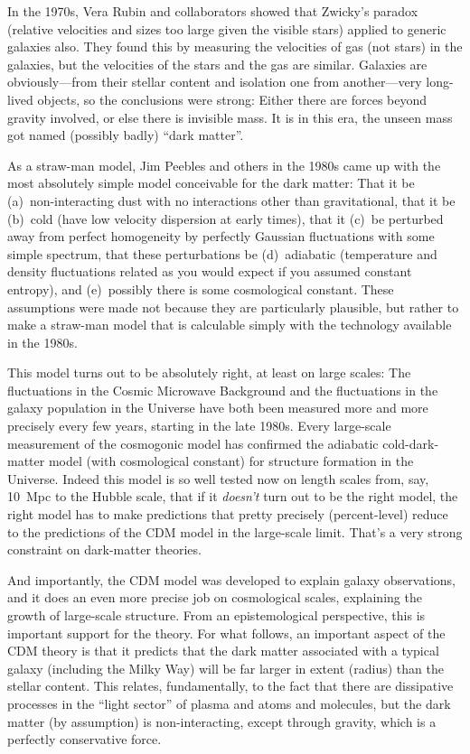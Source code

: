\documentclass[12pt]{article}
\begin{document}
In the 1970s, Vera Rubin and collaborators showed that Zwicky's
paradox (relative velocities and sizes too large given the visible
stars) applied to generic galaxies also.  They found this by measuring
the velocities of gas (not stars) in the galaxies, but the velocities
of the stars and the gas are similar.  Galaxies are obviously---from
their stellar content and isolation one from another---very long-lived
objects, so the conclusions were strong: Either there are forces
beyond gravity involved, or else there is invisible mass.  It is in
this era, the unseen mass got named (possibly badly) ``dark matter''.

As a straw-man model, Jim Peebles and others in the 1980s came up with
the most absolutely simple model conceivable for the dark matter: That
it be (a)~non-interacting dust with no interactions other than
gravitational, that it be (b)~cold (have low velocity dispersion at
early times), that it (c)~be perturbed away from perfect homogeneity
by perfectly Gaussian fluctuations with some simple spectrum, that
these perturbations be (d)~adiabatic (temperature and density
fluctuations related as you would expect if you assumed constant
entropy), and (e)~possibly there is some cosmological constant.  These
assumptions were made not because they are particularly plausible, but
rather to make a straw-man model that is calculable simply with the
technology available in the 1980s.

This model turns out to be absolutely right, at least on large scales:
The fluctuations in the Cosmic Microwave Background and the
fluctuations in the galaxy population in the Universe have both been
measured more and more precisely every few years, starting in the late
1980s.  Every large-scale measurement of the cosmogonic model has
confirmed the adiabatic cold-dark-matter model (with cosmological
constant) for structure formation in the Universe.  Indeed this model
is so well tested now on length scales from, say, 10~Mpc to the Hubble
scale, that if it \emph{doesn't} turn out to be the right model, the
right model has to make predictions that pretty precisely
(percent-level) reduce to the predictions of the CDM model in the
large-scale limit.  That's a very strong constraint on dark-matter
theories.

And importantly, the CDM model was developed to explain galaxy
observations, and it does an even more precise job on cosmological
scales, explaining the growth of large-scale structure.  From an
epistemological perspective, this is important support for the theory.
For what follows, an important aspect of the CDM theory is that it
predicts that the dark matter associated with a typical galaxy
(including the Milky Way) will be far larger in extent (radius) than
the stellar content.  This relates, fundamentally, to the fact that
there are dissipative processes in the ``light sector'' of plasma and
atoms and molecules, but the dark matter (by assumption) is
non-interacting, except through gravity, which is a perfectly
conservative force.
\end{document}
